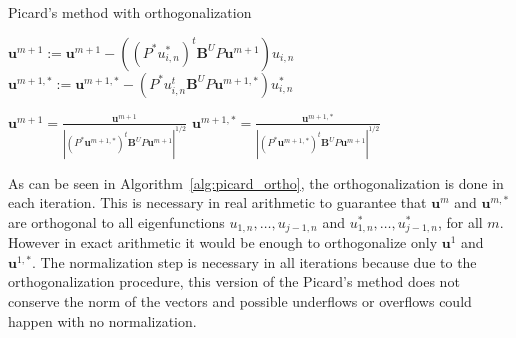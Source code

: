 \documentclass[preprint,12pt]{elsarticle}
\begin{document}
\begin{algorithm}[H] \caption{Picard's method with orthogonalization} \label{alg:picard_ortho} 
\begin{algorithmic}

    

\REPEAT



\STATE $\mathbf{u}^{m+1}:=\mathbf{u}^{m+1}-((P^*u_{i,n}^*)^t\mathbf{B}^U P\mathbf{u}^{m+1})u_{i,n}$
\STATE $\mathbf{u}^{m+1,*}:=\mathbf{u}^{m+1,*}-(P^*u_{i,n}^t\mathbf{B}^U P\mathbf{u}^{m+1,*})u_{i,n}^*$
\ENDFOR


\STATE $\displaystyle \mathbf{u}^{m+1}=\frac{\mathbf{u}^{m+1}}{|(P^*\mathbf{u}^{m+1,*})^t\mathbf{B}^U P\mathbf{u}^{m+1}|^{1/2}}$
\STATE $\displaystyle \mathbf{u}^{m+1,*}=\frac{\mathbf{u}^{m+1,*}}{|(P^*\mathbf{u}^{m+1,*})^t\mathbf{B}^U P\mathbf{u}^{m+1}|^{1/2}}$
\end{algorithmic}
\end{algorithm}

As can be seen in Algorithm~\ref{alg:picard_ortho}, the orthogonalization is done in each iteration. 
This is necessary in real arithmetic to guarantee that $\mathbf{u}^m$ and $\mathbf{u}^{m,*}$ are orthogonal to all 
eigenfunctions $u_{1,n},\dots,u_{j-1,n}$ and $u_{1,n}^*,\dots,u_{j-1,n}^*$, for all $m$. However in exact arithmetic it would 
be enough to orthogonalize only $\mathbf{u}^1$ and $\mathbf{u}^{1,*}$. The normalization step is necessary 
in all iterations because due to the orthogonalization procedure, this version of the Picard's 
method does not conserve the norm of the vectors and possible underflows or overflows could 
happen with no normalization.\\
\end{document}
